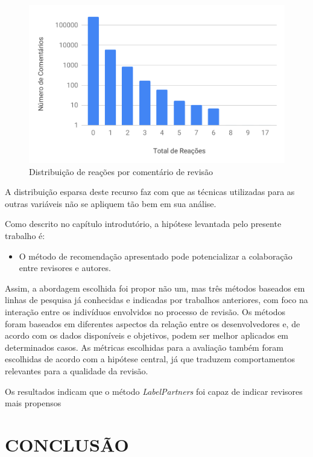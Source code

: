 \documentclass[12pt,openany,oneside,a4paper,english,brazil]{abntbibufjf}
\begin{document}
\begin{figure}[!htbp]
 \includegraphics[width=\textwidth]{dist-rc-reaction}
 \caption{Distribuição de reações por comentário de revisão}\label{fig:dist-rc-reaction}
\end{figure}

A distribuição esparsa deste recurso faz com que as técnicas utilizadas para as outras variáveis não se apliquem tão bem em sua análise.

Como descrito no capítulo introdutório, a hipótese levantada pelo presente trabalho é:

\begin{itemize}
  \item O método de recomendação apresentado pode potencializar a colaboração entre revisores e autores.
\end{itemize}

Assim, a abordagem escolhida foi propor não um, mas três métodos baseados em linhas de pesquisa já conhecidas e indicadas por trabalhos anteriores, com foco na interação entre os indivíduos envolvidos no processo de revisão. Os métodos foram baseados em diferentes aspectos da relação entre os desenvolvedores e, de acordo com os dados disponíveis e objetivos, podem ser melhor aplicados em determinados casos. As métricas escolhidas para a avaliação também foram escolhidas de acordo com a hipótese central, já que traduzem comportamentos relevantes para a qualidade da revisão.

Os resultados indicam que o método \textit{LabelPartners} foi capaz de indicar revisores mais propensos

\chapter{CONCLUSÃO}\label{chap:conclusao}
\end{document}
